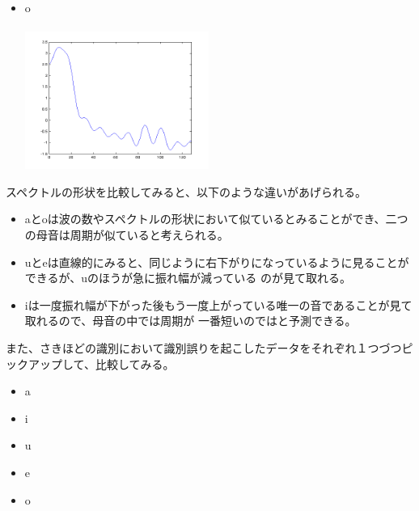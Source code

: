 \documentclass[10pt]{jsarticle}
\begin{document}
\begin{itemize}
\item o\\ \\
\includegraphics[width = 6cm]{result_textures/o_cepstrum.png}
\end{itemize}
\clearpage
スペクトルの形状を比較してみると、以下のような違いがあげられる。
\begin{itemize}
\item aとoは波の数やスペクトルの形状において似ているとみることができ、二つの母音は周期が似ていると考えられる。\\

\item uとeは直線的にみると、同じように右下がりになっているように見ることができるが、uのほうが急に振れ幅が減っている
のが見て取れる。\\

\item iは一度振れ幅が下がった後もう一度上がっている唯一の音であることが見て取れるので、母音の中では周期が
一番短いのではと予測できる。\\
\end{itemize}
また、さきほどの識別において識別誤りを起こしたデータをそれぞれ１つづつピックアップして、比較してみる。
\begin{itemize}
\item a\\
\item i\\
\item u\\
\item e\\
\item o\\
\end{itemize}
\end{document}
